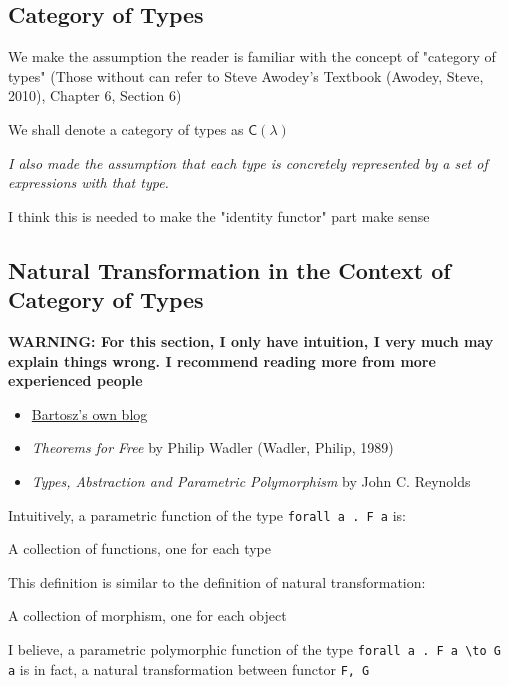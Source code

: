 \documentclass[11pt]{article}
\begin{document}
\subsection{Category of Types}
\label{sec:org14e0e08}
We make the assumption the reader is familiar with the concept of "category of types"
(Those without can refer to Steve Awodey's Textbook (Awodey, Steve, 2010), Chapter 6, Section 6)

We shall denote a category of types as \(\mathsf C (\lambda)\)

\emph{I also made the assumption that each type is concretely represented by a set of expressions with that type.}

I think this is needed to make the "identity functor" part make sense

\subsection{Natural Transformation in the Context of Category of Types}
\label{sec:orgc7ca5b7}

\textbf{WARNING: For this section, I only have intuition, I very much may explain things wrong. I recommend reading more from more experienced people}
\begin{itemize}
\item \href{https://bartoszmilewski.com/2014/09/22/parametricity-money-for-nothing-and-theorems-for-free/}{Bartosz's own blog}
\item \emph{Theorems for Free} by Philip Wadler (Wadler, Philip, 1989)
\item \emph{Types, Abstraction and Parametric Polymorphism} by John C. Reynolds
\end{itemize}

Intuitively, a parametric function of the type \texttt{forall a . F a} is:

\begin{center}
A collection of functions, one for each type
\end{center}

This definition is similar to the definition of natural transformation:

\begin{center}
A collection of morphism, one for each object
\end{center}

I believe, a parametric polymorphic function of the type \texttt{forall a . F a \textbackslash{}to G a} is in fact, a natural transformation between functor \texttt{F, G}
\end{document}

